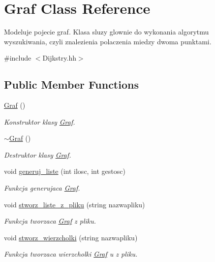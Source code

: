 \hypertarget{class_graf}{\section{Graf Class Reference}
\label{class_graf}
}


Modeluje pojecie graf. Klasa sluzy glownie do wykonania algorytmu wyszukiwania, czyli znalezienia polaczenia miedzy dwoma punktami.  




{\ttfamily \#include $<$Dijkstry.\-hh$>$}

\subsection*{Public Member Functions}
\begin{DoxyCompactItemize}
\item 
\hyperlink{class_graf_a05a504069321858769df57555045d808}{Graf} ()
\begin{DoxyCompactList}\small\item\em Konstruktor klasy \hyperlink{class_graf}{Graf}. \end{DoxyCompactList}\item 
\hyperlink{class_graf_a4ff3904fd04f367ac0219b52719c567e}{$\sim$\-Graf} ()
\begin{DoxyCompactList}\small\item\em Destruktor klasy \hyperlink{class_graf}{Graf}. \end{DoxyCompactList}\item 
void \hyperlink{class_graf_a2fe84bc61e57b1712687af6bda740103}{generuj\-\_\-liste} (int ilosc, int gestosc)
\begin{DoxyCompactList}\small\item\em Funkcja generujaca \hyperlink{class_graf}{Graf}. \end{DoxyCompactList}\item 
void \hyperlink{class_graf_adaba0ec276dc425b2556f2dadae7845f}{stworz\-\_\-liste\-\_\-z\-\_\-pliku} (string nazwapliku)
\begin{DoxyCompactList}\small\item\em Funkcja tworzaca \hyperlink{class_graf}{Graf} z pliku. \end{DoxyCompactList}\item 
void \hyperlink{class_graf_a3fee2a8a88543338f1d54216c2618e2b}{stworz\-\_\-wierzcholki} (string nazwapliku)
\begin{DoxyCompactList}\small\item\em Funkcja tworzaca wierzcholki \hyperlink{class_graf}{Graf} u z pliku. \end{DoxyCompactList}\item 

\end{DoxyCompactItemize}
